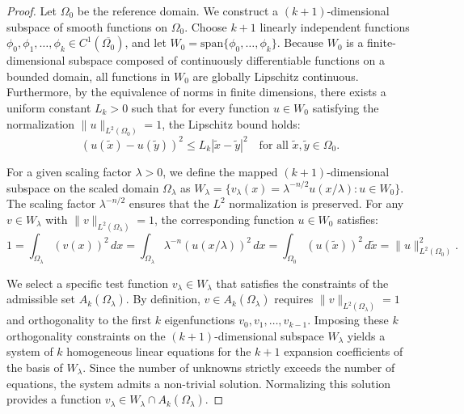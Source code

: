 \documentclass[12pt, a4paper]{article}
\theoremstyle{break}
\theoremstyle{break}
\theoremstyle{break}
\theoremstyle{break}
\theoremstyle{break}
\theoremstyle{break}
\theoremstyle{break}
\theoremstyle{break}
\theoremstyle{break}
\begin{document}
\begin{proof}
    Let $\Omega_0$ be the reference domain. We construct a $(k+1)$-dimensional subspace of smooth functions on $\Omega_0$. Choose $k+1$ linearly independent functions $\phi_0, \phi_1, \dots, \phi_k \in C^1(\overline{\Omega_0})$, and let $W_0 = \text{span}\{\phi_0, \dots, \phi_k\}$. 
    Because $W_0$ is a finite-dimensional subspace composed of continuously differentiable functions on a bounded domain, all functions in $W_0$ are globally Lipschitz continuous. Furthermore, by the equivalence of norms in finite dimensions, there exists a uniform constant $L_k > 0$ such that for every function $u \in W_0$ satisfying the normalization $\|u\|_{L^2(\Omega_0)} = 1$, the Lipschitz bound holds:
    \begin{equation}
        (u(\tilde{x}) - u(\tilde{y}))^2 \leq L_k |\tilde{x} - \tilde{y}|^2 \quad \text{for all } \tilde{x}, \tilde{y} \in \Omega_0.
    \end{equation}

    For a given scaling factor $\lambda > 0$, we define the mapped $(k+1)$-dimensional subspace on the scaled domain $\Omega_\lambda$ as $W_\lambda = \{ v_\lambda(x) = \lambda^{-n/2} u(x/\lambda) : u \in W_0 \}$.
    The scaling factor $\lambda^{-n/2}$ ensures that the $L^2$ normalization is preserved. For any $v \in W_\lambda$ with $\|v\|_{L^2(\Omega_\lambda)} = 1$, the corresponding function $u \in W_0$ satisfies:
    \begin{equation}
        1 = \int_{\Omega_\lambda} (v(x))^2 \, dx = \int_{\Omega_\lambda} \lambda^{-n} (u(x/\lambda))^2 \, dx = \int_{\Omega_0} (u(\tilde{x}))^2 \, d\tilde{x} = \|u\|_{L^2(\Omega_0)}^2.
    \end{equation}

    We select a specific test function $v_\lambda \in W_\lambda$ that satisfies the constraints of the admissible set $A_k(\Omega_\lambda)$. By definition, $v \in A_k(\Omega_\lambda)$ requires $\|v\|_{L^2(\Omega_\lambda)} = 1$ and orthogonality to the first $k$ eigenfunctions $v_0, v_1, \dots, v_{k-1}$. 
    Imposing these $k$ orthogonality constraints on the $(k+1)$-dimensional subspace $W_\lambda$ yields a system of $k$ homogeneous linear equations for the $k+1$ expansion coefficients of the basis of $W_\lambda$. Since the number of unknowns strictly exceeds the number of equations, the system admits a non-trivial solution. Normalizing this solution provides a function $v_\lambda \in W_\lambda \cap A_k(\Omega_\lambda)$.
    

\end{proof}
\end{document}

